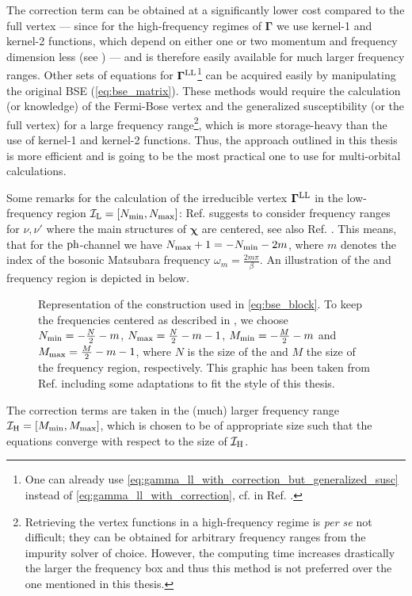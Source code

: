 \documentclass[../../main.tex]{subfiles}
\begin{document}
The correction term can be obtained at a significantly lower cost compared to the full vertex --- since for the high-frequency regimes of $\bm\Gamma$ we use kernel-1 and kernel-2 functions, which depend on either one or two momentum and frequency dimension less (see ) --- and is therefore easily available for much larger frequency ranges. Other sets of equations for $\bm\Gamma^{\text{L}\text{L}}$\footnote{One can already use \eqref{eq:gamma_ll_with_correction_but_generalized_susc} instead of \eqref{eq:gamma_ll_with_correction}, cf.  in Ref. \cite{efficient bse}.} can be acquired easily by manipulating the original BSE (\ref{eq:bse_matrix}). These methods would require the calculation (or knowledge) of the Fermi-Bose vertex and the generalized susceptibility (or the full vertex) for a large frequency range\footnote{Retrieving the vertex functions in a high-frequency regime is \textit{per se} not difficult; they can be obtained for arbitrary frequency ranges from the impurity solver of choice. However, the computing time increases drastically the larger the frequency box and thus this method is not preferred over the one mentioned in this thesis.}, which is more storage-heavy than the use of kernel-1 and kernel-2 functions. Thus, the approach outlined in this thesis is more efficient and is going to be the most practical one to use for multi-orbital calculations.

Some remarks for the calculation of the irreducible vertex $\bm\Gamma^{\text{L}\text{L}}$ in the low-frequency region $\mathcal{I}_{\text{L}}=[N_{\text{min}},N_{\text{max}}]$: Ref. \cite{efficient bse} suggests to consider frequency ranges for $\nu,\nu'$ where the main structures of $\bm\chi$ are centered, see also Ref. \cite{local corr at the two-particle level}. This means, that for the $\text{ph}$-channel we have $N_{\text{max}}+1=-N_{\text{min}}-2m$, where $m$ denotes the index of the bosonic Matsubara frequency $\omega_{m}=\frac{2m\pi}{\beta}$. An illustration of the  and  frequency region is depicted in  below.
\begin{figure}[ht!]
	\centering
  	
  	\caption{Representation of the  construction used in \eqref{eq:bse_block}. To keep the frequencies centered as described in \cite{rohringer two particle level}, we choose $N_{\text{min}}=-\frac{N}{2}-m$, $N_{\text{max}}=\frac{N}{2}-m-1$, $M_{\text{min}}=-\frac{M}{2}-m$ and $M_{\text{max}}=\frac{M}{2}-m-1$, where $N$ is the size of the  and $M$ the size of the  frequency region, respectively. This graphic has been taken from Ref. \cite{efficient BSE} including some adaptations to fit the style of this thesis.}
  	\label{fig:frequency_boxes}
\end{figure}
The correction terms are taken in the (much) larger frequency range $\mathcal{I}_{\text{H}}=[M_{\text{min}}, M_{\text{max}}]$, which is chosen to be of appropriate size such that the equations converge with respect to the size of $\mathcal{I}_{\text{H}}$.
\end{document}

